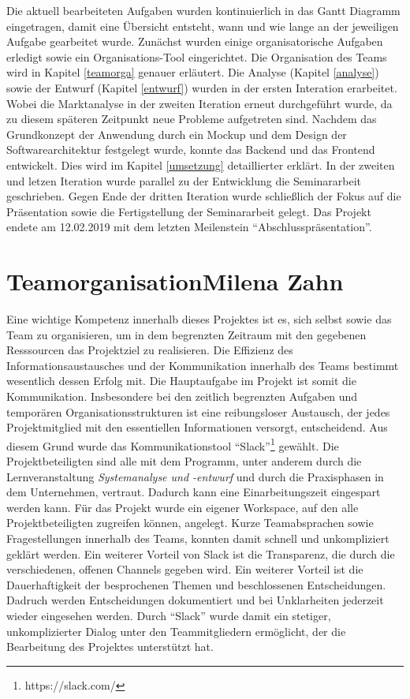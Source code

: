 	Die aktuell bearbeiteten Aufgaben wurden kontinuierlich in das Gantt Diagramm eingetragen, damit eine Übersicht entsteht, wann und wie lange an der jeweiligen Aufgabe gearbeitet wurde. Zunächst wurden einige organisatorische Aufgaben erledigt sowie ein Organisations-Tool eingerichtet. Die Organisation des Teams wird in Kapitel \vref{teamorga} genauer erläutert. Die Analyse (Kapitel \vref{analyse}) sowie der Entwurf (Kapitel \vref{entwurf}) wurden in der ersten Interation erarbeitet. Wobei die Marktanalyse in der zweiten Iteration erneut durchgeführt wurde, da zu diesem späteren Zeitpunkt neue Probleme aufgetreten sind. Nachdem das Grundkonzept der Anwendung durch ein Mockup und dem Design der Softwarearchitektur festgelegt wurde, konnte das Backend und das Frontend entwickelt. Dies wird im Kapitel \vref{umsetzung} detaillierter erklärt. In der zweiten und letzen Iteration wurde parallel zu der Entwicklung die Seminararbeit geschrieben. Gegen Ende der dritten Iteration wurde schließlich der Fokus auf die Präsentation sowie die Fertigstellung der Seminararbeit gelegt. Das Projekt endete am 12.02.2019 mit dem letzten Meilenstein \enquote{Abschlusspräsentation}.
	
	
	\section[Teamorganisation]{Teamorganisation{\hfill \normalsize Milena Zahn}} \label{teamorga}
	Eine wichtige Kompetenz innerhalb dieses Projektes ist es, sich selbst sowie das Team zu organisieren, um in dem begrenzten Zeitraum mit den gegebenen Resssourcen das Projektziel zu realisieren. Die Effizienz des Informationsaustausches und der Kommunikation innerhalb des Teams bestimmt wesentlich dessen Erfolg mit. Die Hauptaufgabe im Projekt ist somit die Kommunikation\autocite[Vgl.][S. 207]{projektmanagement}. Insbesondere bei den zeitlich begrenzten Aufgaben und temporären Organisationsstrukturen ist eine reibungsloser Austausch, der jedes Projektmitglied mit den essentiellen Informationen versorgt, entscheidend. Aus diesem Grund wurde das Kommunikationstool \enquote{Slack}\footnote{https://slack.com/} gewählt. Die Projektbeteiligten sind alle mit dem Programm, unter anderem durch die Lernveranstaltung \textit{Systemanalyse und -entwurf} und durch die Praxisphasen in dem Unternehmen, vertraut. Dadurch kann eine Einarbeitungszeit eingespart werden kann. Für das Projekt wurde ein eigener Workspace, auf den alle Projektbeteiligten zugreifen können, angelegt. Kurze Teamabsprachen sowie Fragestellungen innerhalb des Teams, konnten damit schnell und unkompliziert geklärt werden. Ein weiterer Vorteil von Slack ist die Transparenz, die durch die verschiedenen, offenen Channels gegeben wird. Ein weiterer Vorteil ist die Dauerhaftigkeit der besprochenen Themen und beschlossenen Entscheidungen. Dadruch werden Entscheidungen dokumentiert und bei Unklarheiten jederzeit wieder eingesehen werden. Durch \enquote{Slack} wurde damit ein stetiger, unkomplizierter Dialog unter den Teammitgliedern ermöglicht, der die Bearbeitung des Projektes unterstützt hat.
	
